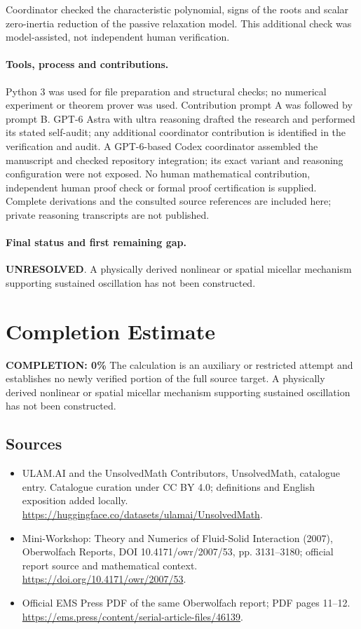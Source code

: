 \documentclass[11pt]{article}
\begin{document}
Coordinator checked the characteristic polynomial, signs of the roots and scalar zero-inertia reduction of the passive relaxation model. This additional check was model-assisted, not independent human verification.

\paragraph{Tools, process and contributions.}
Python 3 was used for file preparation and structural checks; no numerical experiment or theorem prover was used. Contribution prompt A was followed by prompt B. GPT-6 Astra with ultra reasoning drafted the research and performed its stated self-audit; any additional coordinator contribution is identified in the verification and audit. A GPT-6-based Codex coordinator assembled the manuscript and checked repository integration; its exact variant and reasoning configuration were not exposed. No human mathematical contribution, independent human proof check or formal proof certification is supplied. Complete derivations and the consulted source references are included here; private reasoning transcripts are not published.

\paragraph{Final status and first remaining gap.}
\textbf{UNRESOLVED}. A physically derived nonlinear or spatial micellar mechanism supporting sustained oscillation has not been constructed.

\section{Completion Estimate}
\noindent\textbf{COMPLETION: 0\%}
The calculation is an auxiliary or restricted attempt and establishes no newly verified portion of the full source target. A physically derived nonlinear or spatial micellar mechanism supporting sustained oscillation has not been constructed.

\subsection{Sources}
\begin{itemize}
\item[\hypertarget{source:statement:1}{S1}] ULAM.AI and the UnsolvedMath Contributors, UnsolvedMath, catalogue entry. Catalogue curation under CC BY 4.0; definitions and English exposition added locally.
\url{https://huggingface.co/datasets/ulamai/UnsolvedMath}.
\item[\hypertarget{source:statement:2}{S2}] Mini-Workshop: Theory and Numerics of Fluid-Solid Interaction (2007), Oberwolfach Reports, DOI 10.4171/owr/2007/53, pp. 3131--3180; official report source and mathematical context.
\url{https://doi.org/10.4171/owr/2007/53}.
\item[\hypertarget{source:statement:3}{S3}] Official EMS Press PDF of the same Oberwolfach report; PDF pages 11--12.
\url{https://ems.press/content/serial-article-files/46139}.
\end{itemize}
\label{end:statement}
\end{document}
